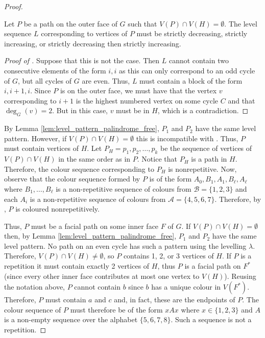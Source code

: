 \documentclass{patmorin}
\begin{document}
\begin{proof}
 \begin{clm}
    Let $P$ be a path on the outer face of $G$ such that $V(P) \cap V(H)
    = \emptyset$. The level sequence $L$ corresponding to vertices of
    $P$ must be strictly decreasing, strictly increasing, or strictly
    decreasing then strictly increasing.
 \end{clm}
 \begin{proof}[Proof of ]
   Suppose that this is not the case. Then $L$ cannot contain two
   consecutive elements of the form $i,i$ as this can only correspond
   to an odd cycle of $G$, but all cycles of $G$ are even. Thus, $L$
   must contain a block of the form $i,i+1,i$. Since $P$ is on the outer
   face, we must have that the vertex $v$ corresponding to $i+1$ is the
   highest numbered vertex on some cycle $C$ and that $\deg_G(v)=2$. But
   in this case, $v$ must be in $H$, which is a contradiction.
 \end{proof}
 By Lemma \ref{lem:level_pattern_palindrome_free}, $P_1$ and $P_2$ have
 the same level pattern. However, if $V(P) \cap V(H) = \emptyset$ this
 is incompatible with .  Thus, $P$ must contain
 vertices of $H$. Let $P_H=p_1,p_2,\ldots,p_k$ be the sequence of vertices
 of $V(P) \cap V(H)$ in the same order as in $P$. Notice that $P_H$ is
 a path in $H$.  Therefore, the colour sequence corresponding to $P_H$
 is nonrepetitive.  Now, observe that the colour sequence formed by $P$
 is of the form $A_0,B_1,A_1,B_\ell,A_\ell$ where $B_1,\ldots,B_\ell$
 is a non-repetitive sequence of colours from $\mathcal{B}=\{1,2,3\}$ and
 each $A_i$ is a non-repetitive sequence of colours from $\mathcal{A}=\{4,5,6,7\}$.
 Therefore, by , $P$ is coloured nonrepetitively.

Thus, $P$ must be a facial path on some inner face $F$ of $G$.  If $V(P) \cap V(H) =
\emptyset$ then, by Lemma \ref{lem:level_pattern_palindrome_free},
$P_1$ and $P_2$ have the same level pattern.  No path on an even cycle
has such a pattern using the levelling $\lambda$.
Therefore, $V(P)\cap V(H)\neq\emptyset$, so $P$ contains 1, 2, or
3 vertices of $H$.  If $P$ is a repetition it must contain exactly
2 vertices of $H$, thus $P$ is a facial path on $F^*$ (since every
other inner face contributes at most one vertex to $V(H)$).  Reusing the
notation above, $P$ cannot contain $b$ since $b$ has a unique colour in
$V(F^*)$. Therefore, $P$ must contain $a$ and $c$ and, in fact, these are
the endpoints of $P$.  The colour sequence of $P$ must therefore be of
the form $xAx$ where $x\in\{1,2,3\}$ and $A$ is a non-empty sequence over
the alphabet $\{5,6,7,8\}$.  Such a sequence is not a repetition.
\end{proof}
\end{document}

